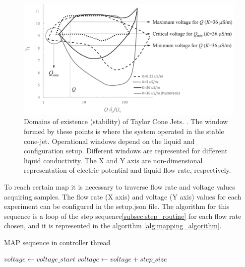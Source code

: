 \begin{figure}[H]
    \center
    \includegraphics[width=13cm]{Figuras/ganan_calvo_map.png}
    \caption{Domains of existence (stability) of Taylor Cone Jets. \cite{gananCalvo} . The window formed by these points is where the system operated in the stable cone-jet. Operational windows depend on the liquid and configuration setup. Different windows are represented for different liquid conductivity. The X and Y axis are non-dimensional representation of electric potential and liquid flow rate, respectively.}
    \label{fig:ganan_calvo_fig}
\end{figure}

To reach certain map it is necessary to traverse flow rate and voltage values acquiring samples.
The flow rate (X axis) and voltage (Y axis) values for each experiment can be configured in the setup.json file.
The algorithm for this sequence is a loop of the step sequence\ref{subsec:step_routine} for each flow rate chosen, and it is represented in the algorithm \ref{alg:mapping_algorithm}.


    \begin{algorithm}
        \caption{MAP sequence in controller thread}\label{alg:mapping_algorithm}
        \begin{algorithmic}
              
                \State {}
                \State $voltage \gets voltage\_start$
                 
                    \State {}
                    \State {}
                    \State $voltage \gets voltage + step\_size$
                \EndWhile
            \EndFor
        \EndProcedure

        \end{algorithmic}
    \end{algorithm}

